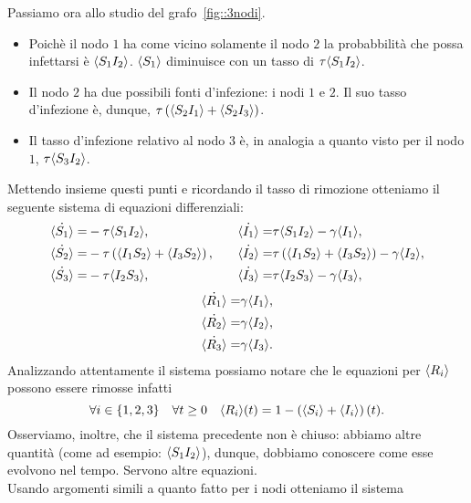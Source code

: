 Passiamo ora allo studio del grafo~\ref{fig::3nodi}.
\begin{itemize}
	

\item Poich\`e il nodo $1$ ha come vicino solamente il nodo $2$ la probabbilit\`a che possa infettarsi \`e $\langle S_1 I_2 \rangle $. $\langle S_1 \rangle$ diminuisce con un tasso di $\tau \langle S_1 I_2 \rangle$.
\item Il nodo $2$ ha due possibili fonti d'infezione: i nodi $1$ e $2$. Il suo tasso d'infezione \`e, dunque,  $\tau \left(  \langle S_2I_1 \rangle + \langle S_2 I_3 \rangle \right)$.
\item Il tasso d'infezione relativo al nodo $3$ \`e,  
in analogia a quanto visto per il nodo $1$, $\tau\langle S_3I_2 \rangle$.
\end{itemize}
Mettendo insieme questi punti e ricordando il tasso di rimozione otteniamo il seguente sistema di equazioni differenziali:
\begin{equation*}
\begin{aligned}
	\dot{\langle S_1 \rangle} = & -\tau \langle  S_1 I_2 \rangle, 
\quad &
	\dot{\langle I_1 \rangle} = & \tau \langle S_1 I_2 \rangle-\gamma \langle I_1 \rangle, 
\\
	\dot{\langle S_2 \rangle} = & -\tau \left(  \langle  I_1 S_2 \rangle + \langle I_3S_2 \rangle \right),	
\quad & 
	\dot{\langle I_2 \rangle} = & \tau \left(  \langle  I_1 S_2 \rangle + \langle I_3S_2 \rangle \right)-\gamma \langle I_2 \rangle,
\\
	\dot{\langle S_3 \rangle} = & -\tau \langle  I_2 S_3 \rangle,
\quad & 
	\dot{\langle I_3 \rangle} = & \tau \langle  I_2 S_3 \rangle-\gamma \langle I_3 \rangle,
\end{aligned}
\end{equation*}
\begin{equation*} 
\begin{aligned}
	\dot{\langle R_1 \rangle} = & \gamma \langle  I_1 \rangle,\\
	\dot{\langle R_2 \rangle} = & \gamma \langle  I_2 \rangle,\\
 	\dot{\langle R_3 \rangle} = & \gamma \langle  I_3 \rangle.
 	\end{aligned}
\end{equation*}
Analizzando attentamente il sistema possiamo notare che le equazioni per $\langle R_i \rangle$ possono essere rimosse infatti 
$$ \forall i\in\{1, 2, 3\} \quad \forall t\geq 0 \quad \langle R_i \rangle(t) = 1 - \left( \langle S_i \rangle +\langle I_i \rangle \right)(t).$$
Osserviamo, inoltre, che il sistema precedente non \`e chiuso: abbiamo altre quantit\`a  (come ad esempio: $\langle S_1I_2 \rangle$), dunque, dobbiamo conoscere come esse evolvono nel tempo. Servono altre equazioni.\\
Usando argomenti simili a quanto fatto per i nodi otteniamo  il sistema 

